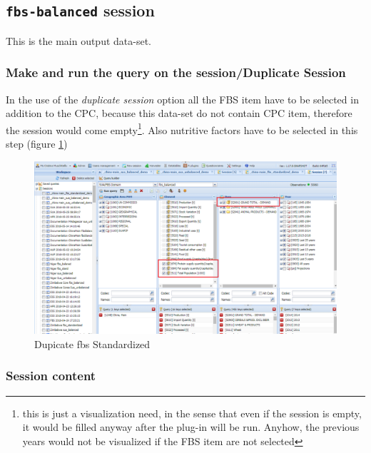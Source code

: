 \documentclass[]{article}
\let\rmarkdownfootnote\footnote%
\def\footnote{\protect\rmarkdownfootnote}
\begin{document}
\subsection{\texorpdfstring{\texttt{fbs-balanced}
session}{fbs-balanced session}}\label{fbs-balanced-session}

This is the main output data-set.

\subsubsection{Make and run the query on the session/Duplicate
Session}\label{make-and-run-the-query-on-the-sessionduplicate-session-2}

In the use of the \emph{duplicate session} option all the FBS item have
to be selected in addition to the CPC, because this data-set do not
contain CPC item, therefore the session would come empty\footnote{this
  is just a visualization need, in the sense that even if the session is
  empty, it would be filled anyway after the plug-in will be run.
  Anyhow, the previous years would not be visualized if the FBS item are
  not selected}. Also nutritive factors have to be selected in this step
(figure \ref{fig:f23})

\begin{figure}[H]

{\centering \includegraphics[width=1\linewidth]{images/standPlugin/23_duplicateStandardized} 

}

\caption{\label{fig:f23}Dupicate fbs Standardized}\label{fig:f23}
\end{figure}

\subsubsection{Session content}\label{session-content-2}
\end{document}
